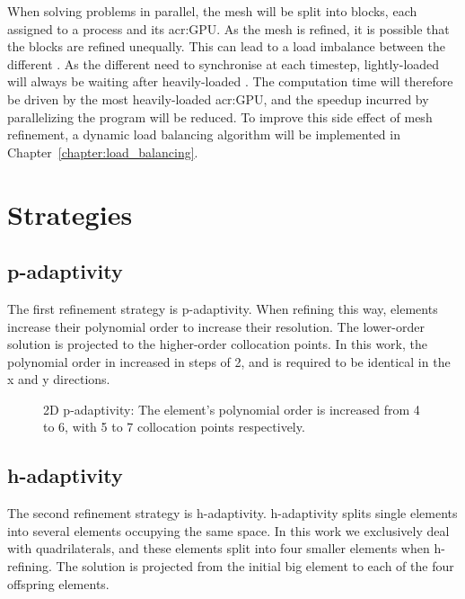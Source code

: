 When solving problems in parallel, the mesh will be split into blocks, each assigned to a process
and its \acrshort{acr:GPU}. As the mesh is refined, it is possible that the blocks are refined
unequally. This can lead to a load imbalance between the different . As the
different  need to synchronise at each timestep, lightly-loaded
 will always be waiting after heavily-loaded . The
computation time will therefore be driven by the most heavily-loaded \acrshort{acr:GPU}, and the
speedup incurred by parallelizing the program will be reduced. To improve this side effect of mesh
refinement, a dynamic load balancing algorithm will be implemented in
Chapter~\ref{chapter:load_balancing}.

\section{Strategies}\label{section:adaptive_mesh_refinement:adaptivity_strategies}

\subsection{p-adaptivity}\label{subsection:adaptive_mesh_refinement:adaptivity_strategies:p-adaptivity}

The first refinement strategy is p-adaptivity. When refining this way, elements increase their
polynomial order to increase their resolution. The lower-order solution is projected to the
higher-order collocation points. In this work, the polynomial order in increased in steps of 2, and
is required to be identical in the x and y directions. 

\begin{figure}[H]
	\centering
	
	\caption{2D p-adaptivity: The element's polynomial order is increased from 4 to 6, with 5 to 7 collocation points respectively.}\label{fig:p-adaptivity}
\end{figure}

\subsection{h-adaptivity}\label{subsection:adaptive_mesh_refinement:adaptivity_strategies:h-adaptivity}

The second refinement strategy is h-adaptivity\@. h-adaptivity splits single elements into several
elements occupying the same space. In this work we exclusively deal with quadrilaterals, and these
elements split into four smaller elements when h-refining. The solution is projected from the
initial big element to each of the four offspring elements.

